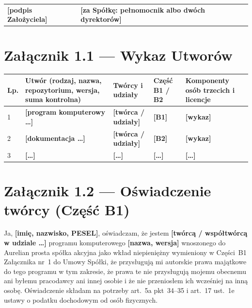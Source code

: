 \documentclass[12pt,a4paper]{report}
\newcommand{\field}[1]{\textbf{[#1]}}
\newcommand{\CompanyFull}{Aurelian prosta spółka akcyjna}
\begin{document}
\vspace{0.8cm}
\begin{center}
\begin{tabularx}{\textwidth}{XX}
\field{podpis Założyciela} & \field{za Spółkę: pełnomocnik albo dwóch dyrektorów} \\
\end{tabularx}
\end{center}

\section*{Załącznik 1.1 --- Wykaz Utworów}

\begin{center}
\begin{tabularx}{\linewidth}{@{}p{0.75cm} >{\raggedright\arraybackslash}X >{\raggedright\arraybackslash}p{3.4cm} >{\raggedright\arraybackslash}p{2.6cm} >{\raggedright\arraybackslash}p{3.0cm}@{}}
\toprule
\textbf{Lp.} & \textbf{Utwór (rodzaj, nazwa, repozytorium, wersja, suma kontrolna)} & \textbf{Twórcy i udziały} & \textbf{Część B1 / B2} & \textbf{Komponenty osób trzecich i licencje} \\
\midrule
1 & \field{program komputerowy \ldots} & \field{twórca / udziały} & \field{B1} & \field{wykaz} \\
2 & \field{dokumentacja \ldots} & \field{twórca / udziały} & \field{B2} & \field{wykaz} \\
3 & \field{\ldots} & \field{\ldots} & \field{\ldots} & \field{\ldots} \\
\bottomrule
\end{tabularx}
\end{center}

\section*{Załącznik 1.2 --- Oświadczenie twórcy (Część B1)}

Ja, \field{imię, nazwisko, PESEL}, oświadczam, że jestem \field{twórcą / współtwórcą w udziale \ldots} programu komputerowego \field{nazwa, wersja} wnoszonego do \CompanyFull{} jako wkład niepieniężny wymieniony w Części~B1 Załącznika nr~1 do Umowy Spółki, że przysługują mi autorskie prawa majątkowe do tego programu w tym zakresie, że prawa te nie przysługują mojemu obecnemu ani byłemu pracodawcy ani innej osobie i że nie przeniosłem ich wcześniej na inną osobę. Oświadczenie składam na potrzeby art.~5a pkt~34--35 i art.~17 ust.~1e ustawy o podatku dochodowym od osób fizycznych.
\end{document}
